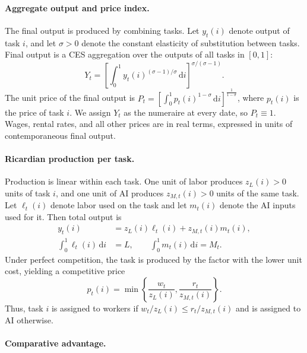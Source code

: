 \documentclass[11pt]{article}
\begin{document}
\paragraph{Aggregate output and price index.}

The final output is produced by combining tasks. Let $y_{t}(i)$ denote
output of task $i$, and let $\sigma>0$ denote the constant elasticity
of substitution between tasks. Final output is a CES aggregation over
the outputs of all tasks in $[0,1]$:
\begin{equation}
Y_{t}=\left[\int^{1}_{0}y_{t}(i)^{(\sigma-1)/\sigma}\,\mathrm{d}i\right]^{\sigma/(\sigma-1)}.\label{eq:task-aggregator}
\end{equation}
The unit price of the final output is $P_{t}=\left[\int^{1}_{0}p_{t}(i)^{1-\sigma}\,\mathrm{d}i\right]^{\frac{1}{1-\sigma}}$,
where $p_{t}(i)$ is the price of task $i$. We assign $Y_{t}$ as
the numeraire at every date, so $P_{t}\equiv1$. Wages, rental rates,
and all other prices are in real terms, expressed in units of contemporaneous
final output.

\paragraph{Ricardian production per task.}

Production is linear within each task. One unit of labor produces
$z_{L}(i)>0$ units of task $i$, and one unit of AI produces $z_{M,t}(i)>0$
units of the same task. Let $\ell_{t}(i)$ denote labor used on the
task and let $m_{t}(i)$ denote the AI inputs used for it. Then total
output is
\begin{equation}
\begin{aligned}y_{t}(i) & =z_{L}(i)\ell_{t}(i)+z_{M,t}(i)m_{t}(i),\\
\int^{1}_{0}\ell_{t}(i)\,\mathrm{d}i & =L,\qquad\int^{1}_{0}m_{t}(i)\,\mathrm{d}i=M_{t}.
\end{aligned}
\label{eq:task-technology-main}
\end{equation}
Under perfect competition, the task is produced by the factor with
the lower unit cost, yielding a competitive price
\begin{equation}
p_{t}(i)=\min\left\{ \frac{w_{t}}{z_{L}(i)},\frac{r_{t}}{z_{M,t}(i)}\right\} .\label{eq:task-price-main}
\end{equation}
Thus, task $i$ is assigned to workers if $w_{t}/z_{L}(i)\leq r_{t}/z_{M,t}(i)$
and is assigned to AI otherwise.

\paragraph{Comparative advantage.}
\end{document}
